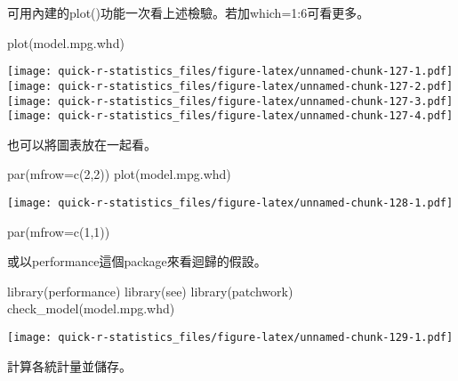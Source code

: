 \documentclass[
]{book}
\newenvironment{Shaded}{\begin{snugshade}}{\end{snugshade}}
\newcommand{\AttributeTok}[1]{\textcolor[rgb]{0.77,0.63,0.00}{#1}}
\newcommand{\DecValTok}[1]{\textcolor[rgb]{0.00,0.00,0.81}{#1}}
\newcommand{\FunctionTok}[1]{\textcolor[rgb]{0.00,0.00,0.00}{#1}}
\newcommand{\NormalTok}[1]{#1}
\begin{document}
可用內建的plot()功能一次看上述檢驗。若加which=1:6可看更多。

\begin{Shaded}
\begin{Highlighting}[]
\FunctionTok{plot}\NormalTok{(model.mpg.whd)}
\end{Highlighting}
\end{Shaded}

\texttt{[image: quick-r-statistics\_files/figure-latex/unnamed-chunk-127-1.pdf]} \texttt{[image: quick-r-statistics\_files/figure-latex/unnamed-chunk-127-2.pdf]} \texttt{[image: quick-r-statistics\_files/figure-latex/unnamed-chunk-127-3.pdf]} \texttt{[image: quick-r-statistics\_files/figure-latex/unnamed-chunk-127-4.pdf]}

也可以將圖表放在一起看。

\begin{Shaded}
\begin{Highlighting}[]
\FunctionTok{par}\NormalTok{(}\AttributeTok{mfrow=}\FunctionTok{c}\NormalTok{(}\DecValTok{2}\NormalTok{,}\DecValTok{2}\NormalTok{))}
\FunctionTok{plot}\NormalTok{(model.mpg.whd)}
\end{Highlighting}
\end{Shaded}

\texttt{[image: quick-r-statistics\_files/figure-latex/unnamed-chunk-128-1.pdf]}

\begin{Shaded}
\begin{Highlighting}[]
\FunctionTok{par}\NormalTok{(}\AttributeTok{mfrow=}\FunctionTok{c}\NormalTok{(}\DecValTok{1}\NormalTok{,}\DecValTok{1}\NormalTok{))}
\end{Highlighting}
\end{Shaded}

或以performance這個package來看迴歸的假設。

\begin{Shaded}
\begin{Highlighting}[]
\FunctionTok{library}\NormalTok{(performance)}
\FunctionTok{library}\NormalTok{(see)}
\FunctionTok{library}\NormalTok{(patchwork)}
\FunctionTok{check\_model}\NormalTok{(model.mpg.whd)}
\end{Highlighting}
\end{Shaded}

\texttt{[image: quick-r-statistics\_files/figure-latex/unnamed-chunk-129-1.pdf]}

計算各統計量並儲存。
\end{document}
